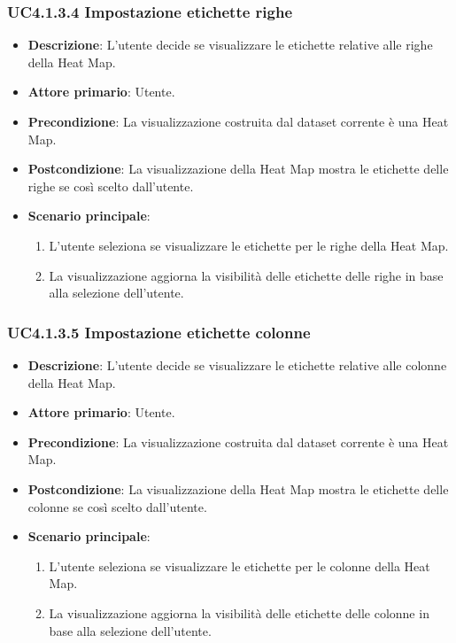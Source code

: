 \subsubsection{UC4.1.3.4 Impostazione etichette righe}
\label{subsec:uc4.1.3.4}
\begin{itemize}
    \item \textbf{Descrizione}: L’utente decide se visualizzare le etichette relative alle righe della Heat Map.

    \item \textbf{Attore primario}: Utente.
    
    \item \textbf{Precondizione}:   La visualizzazione costruita dal dataset corrente è una Heat Map.
    \item \textbf{Postcondizione}:  La visualizzazione della Heat Map mostra le etichette delle righe se così scelto dall'utente.

	\item \textbf{Scenario principale}:
        \begin{enumerate}
            \item   L'utente seleziona se visualizzare le etichette per le righe della Heat Map.
            \item   La visualizzazione aggiorna la visibilità delle etichette delle righe in base alla selezione dell'utente.
                    
        \end{enumerate}
\end{itemize}



\subsubsection{UC4.1.3.5 Impostazione etichette colonne}
\label{subsec:uc4.1.3.5}
\begin{itemize}
    \item \textbf{Descrizione}: L’utente decide se visualizzare le etichette relative alle colonne della Heat Map.

    \item \textbf{Attore primario}: Utente.
    
    \item \textbf{Precondizione}:   La visualizzazione costruita dal dataset corrente è una Heat Map.
    \item \textbf{Postcondizione}:  La visualizzazione della Heat Map mostra le etichette delle colonne se così scelto dall'utente.

	\item \textbf{Scenario principale}:
        \begin{enumerate}
            \item   L'utente seleziona se visualizzare le etichette per le colonne della Heat Map.
            \item   La visualizzazione aggiorna la visibilità delle etichette delle colonne in base alla selezione dell'utente.
                    
        \end{enumerate}
\end{itemize}


